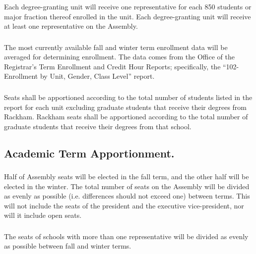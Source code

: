 \subsubsection{}
Each degree-granting unit will receive one representative for each 850 students or major fraction thereof enrolled in the unit.  Each degree-granting unit will receive at least one representative on the Assembly.

\subsubsection{}
The most currently available fall and winter term enrollment data will be averaged for determining enrollment.  The data comes from the Office of the Registrar's Term Enrollment and Credit Hour Reports; specifically, the ``102-Enrollment by Unit, Gender, Class Level'' report.

\subsubsection{}
Seats shall be apportioned according to the total number of students listed in the report for each unit excluding graduate students that receive their degrees from Rackham.  Rackham seats shall be apportioned according to the total number of graduate students that receive their degrees from that school.

\subsection{Academic Term Apportionment.}

\subsubsection{}
Half of Assembly seats will be elected in the fall term, and the other half will be elected in the winter.  The total number of seats on the Assembly will be divided as evenly as possible (i.e. differences should not exceed one) between terms.  This will not include the seats of the president and the executive vice-president, nor will it include open seats.

\subsubsection{}
The seats of schools with more than one representative will be divided as evenly as possible between fall and winter terms.

